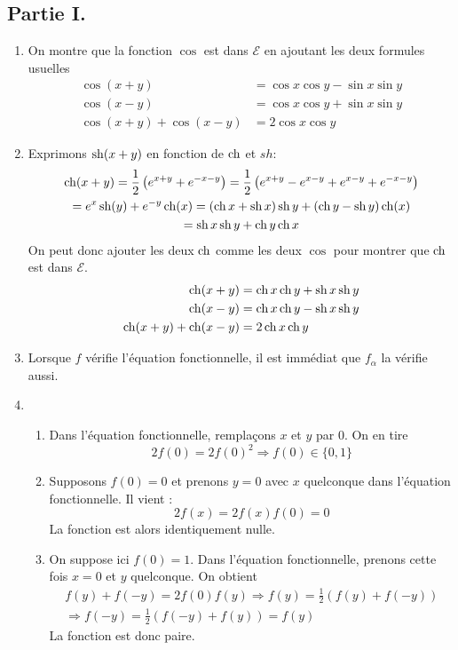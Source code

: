 \subsection*{Partie I.}
\begin{enumerate}
 \item On montre que la fonction $\cos$ est dans $\mathcal E$ en ajoutant les deux formules usuelles
\begin{align*}
 \cos(x+y) &= \cos x \cos y - \sin x \sin y\\
 \cos(x-y) &= \cos x \cos y + \sin x \sin y \\
 \cos (x+y)+\cos(x-y) &= 2\cos x \cos y
\end{align*}

 \item Exprimons $\operatorname{sh}(x+y)$ en fonction de $\operatorname{ch}$ et $sh$:
\begin{multline*}
 \operatorname{ch}(x+y) = \frac{1}{2}\left( e^{x+y} + e^{-x-y}\right) 
=\frac{1}{2}\left( e^{x+y} - e^{x-y} + e^{x-y} +e^{-x-y}\right)\\
=e^x \operatorname{sh}(y) +e^{-y}\operatorname{ch}(x)
=(\operatorname{ch} x +\operatorname{sh} x)\operatorname{sh} y +(\operatorname{ch} y - \operatorname{sh} y)\operatorname{ch}(x) \\= \operatorname{sh} x \operatorname{sh} y + \operatorname{ch} y \operatorname{ch} x
\end{multline*}
On peut donc ajouter les deux $\operatorname{ch}$ comme les deux $\cos$ pour montrer que $\operatorname{ch}$ est dans $\mathcal E$.
\begin{align*}
 \operatorname{ch}(x+y) &= \operatorname{ch} x \operatorname{ch} y + \operatorname{sh} x \operatorname{sh} y\\
 \operatorname{ch}(x-y) &= \operatorname{ch} x \operatorname{ch} y - \operatorname{sh} x \operatorname{sh} y\\
 \operatorname{ch}(x+y) + \operatorname{ch}(x-y) &= 2\operatorname{ch} x \operatorname{ch} y
\end{align*}
 \item Lorsque $f$ vérifie l'équation fonctionnelle, il est immédiat que $f_\alpha$ la vérifie aussi.
 \item 
\begin{enumerate}
  \item Dans l'équation fonctionnelle, remplaçons $x$ et $y$ par $0$. On en tire
\begin{displaymath}
 2f(0)=2f(0)^2\Rightarrow f(0)\in\{0,1\}
\end{displaymath}
 
  \item Supposons $f(0)=0$ et prenons $y=0$ avec $x$ quelconque dans l'équation fonctionnelle. Il vient :
\begin{displaymath}
 2f(x) = 2f(x)f(0)=0
\end{displaymath}
La fonction est alors identiquement nulle.
  \item On suppose ici $f(0)=1$. Dans l'équation fonctionnelle, prenons cette fois $x=0$ et $y$ quelconque. On obtient
\begin{multline*}
 f(y)+f(-y)=2f(0)f(y)\Rightarrow f(y) =\frac{1}{2}\left( f(y)+f(-y)\right) \\
\Rightarrow f(-y) =\frac{1}{2}\left( f(-y)+f(y)\right) = f(y)
\end{multline*}
La fonction est donc paire.
\end{enumerate}
 
\end{enumerate}
